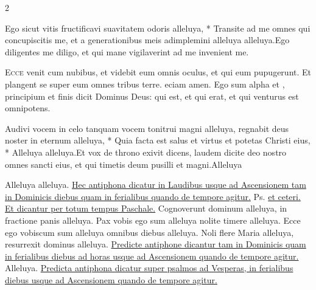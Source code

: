 \begin{multicols*}{2}
\begin{responsory}
{Ego sicut vitis fructificavi suavitatem odoris alleluya, * Transite ad me omnes qui concupiscitis me, et a generationibus meis adimplemini alleluya alleluya.}{Ego diligentes me diligo, et qui mane vigilaverint ad me invenient me.}
\end{responsory}%
\lettrine[lines=2]{\zallmancaps \color{Red} E}{cce} venit cum nubibus, et videbit eum omnis oculus, et qui eum pupugerunt. Et plangent se super eum omnes tribus terre. eciam amen. Ego sum alpha et \omega , principium et finis dicit Dominus Deus: qui est, et qui erat, et qui venturus est omnipotens.
\begin{responsory-final}
{Audivi vocem in celo tanquam vocem tonitrui magni alleluya, regnabit deus noster in eternum alleluya, * Quia facta est salus et virtus et potetas Christi eius, * Alleluya alleluya.}{Et vox de throno exivit dicens, laudem dicite deo nostro omnes sancti eius, et qui timetis deum pusilli et magni.}{Alleluya}
\end{responsory-final}%
 Alleluya alleluya. \ul{Hec antiphona dicatur in Laudibus usque ad Ascensionem tam in Dominicis diebus quam in ferialibus quando de tempore agitur.} {\color{Red} Ps.}  \ul{et ceteri. Et dicantur per totum tempus Paschale.}
 Cognoverunt dominum alleluya, in fractione panis alleluya.
 Pax vobis ego sum alleluya nolite timere alleluya.
 Ecce ego vobiscum sum alleluya omnibus diebus alleluya.
 Noli flere Maria alleluya, resurrexit dominus alleluya.
\newline \ul{Predicte antiphone dicantur tam in Dominicis quam in ferialibus diebus ad horas usque ad Ascensionem quando de tempore agitur.}
 Alleluya.
\newline \ul{Predicta antiphona dicatur super psalmos ad Vesperas, in ferialibus diebus usque ad Ascensionem quando de tempore agitur.}

\end{multicols*}
